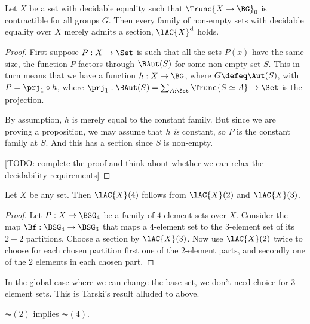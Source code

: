 \begin{theorem}[Blass]\label{thm:Blass}
  Let $X$ be a set with decidable equality such that $\Trunc{X \to \BG}_0$ is contractible
  for all groups $G$.
  Then every family of non-empty sets with decidable equality over $X$
  merely admits a section,
  \ie $\lAC{X}^{\mathrm{d}}$ holds.
\end{theorem}

\begin{proof}
  First suppose $P : X \to \Set$ is such that all the sets $P(x)$
  have the same size, \ie the function $P$ factors through
  $\BAut(S)$ for some non-empty set $S$.
  This in turn means that we have a function $h : X \to \BG$,
  where $G \defeq \Aut(S)$, with $P = \prj_1 \circ h$,
  where $\prj_1 : \BAut(S) = \sum_{A : \Set}\Trunc{S \simeq A} \to \Set$
  is the projection.

  By assumption, $h$ is merely equal to the constant family.
  But since we are proving a proposition, we may assume that $h$
  \emph{is} constant, so $P$ is the constant family at $S$.
  And this has a section since $S$ is non-empty.

  [TODO: complete the proof and think about whether we can relax the
  decidability requirements]
\end{proof}

\begin{theorem}
  Let $X$ be any set. Then $\lAC{X}(4)$ follows from $\lAC{X}(2)$ and $\lAC{X}(3)$.
\end{theorem}

\begin{proof}
  Let $P : X \to \BSG_4$ be a family of $4$-element sets over $X$.
  Consider the map $\Bf : \BSG_4 \to \BSG_3$ that maps a $4$-element set
  to the $3$-element set of its $2+2$ partitions.
  Choose a section by $\lAC{X}(3)$.
  Now use $\lAC{X}(2)$ twice to choose for each chosen partition
  first one of the $2$-element parts, and secondly one of the $2$
  elements in each chosen part.
\end{proof}

In the global case where we can change the base set,
we don't need choice for $3$-element sets.
This is Tarski's result alluded to above.

\begin{theorem}
  $\AC(2)$ implies $\AC(4)$.
\end{theorem}

